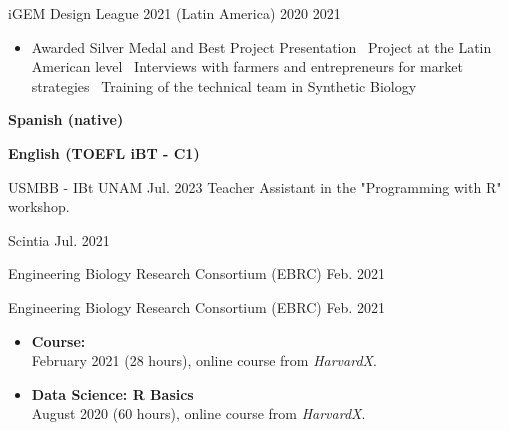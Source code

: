 \documentclass{simplecv}
\newcommand{\mydot}{\raisebox{0.5 ex}{.}\ }
\begin{document}
    {iGEM Design League 2021 (Latin America)}
    {}
    {2020}
    {2021}
    {%
        \vspace{-11pt}
        \begin{itemize}[leftmargin=*]
        \setlength{\itemsep}{0cm}
          \item Awarded Silver Medal and Best Project Presentation \mydot Project at the Latin American level \mydot Interviews with farmers and entrepreneurs for market strategies \mydot Training of the technical team in Synthetic Biology
        \end{itemize}
    }

\newpage

\printbibliography[heading=none]
    

\setlength\columnsep{0.33in}
\begin{multicols}{2}


\textbf{Spanish (native)}\\

\medskip

\textbf{English (TOEFL iBT - C1)}\\


    {USMBB - IBt UNAM}
    {}
    {}{Jul. 2023}
    {Teacher Assistant in the "Programming with R" workshop.}

    {Scintia}
    {}
    {}{Jul. 2021}
    {}

    {Engineering Biology Research Consortium (EBRC)}
    {}
    {}{Feb. 2021}
    {}

    {Engineering Biology Research Consortium (EBRC)}
    {}
    {}{Feb. 2021}
    {}

{\small
  \begin{itemize}[leftmargin=*]
  \setlength{\itemsep}{6pt}
    \item \textbf{Course: }\\February 2021 (28 hours), online course from \textit{HarvardX}.
    \item \textbf{Data Science: R Basics}\\August 2020 (60 hours), online course from \textit{HarvardX}.
  \end{itemize}
}

\end{multicols}
\end{document}
